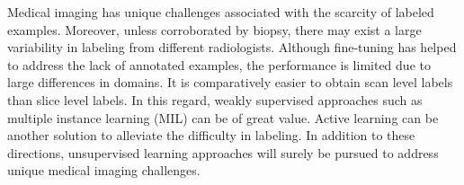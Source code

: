 \documentclass[journal]{IEEEtran}
\begin{document}
Medical imaging has unique challenges associated with the scarcity of labeled examples. Moreover, unless corroborated by biopsy, there may exist a large variability in labeling from different radiologists. Although fine-tuning has helped to address the lack of annotated
examples, the performance is limited due to large differences in domains. It is comparatively easier to obtain scan level labels than slice level labels. In this regard, weakly supervised approaches such as multiple instance learning (MIL) can be of great value. Active learning can be another solution to alleviate the difficulty in labeling. In addition to these directions, unsupervised learning approaches will surely be pursued to address unique medical imaging challenges.
%
%
%
\end{document}
